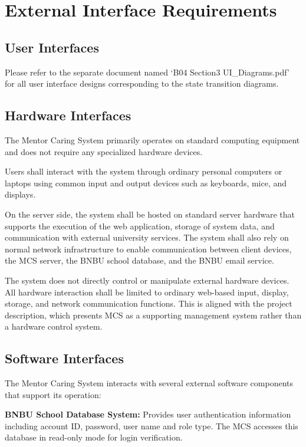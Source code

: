 \section{External Interface Requirements}

\subsection{User Interfaces}

Please refer to the separate document named `B04 Section3 UI\_Diagrams.pdf' for all user interface designs corresponding to the state transition diagrams.

\subsection{Hardware Interfaces}

The Mentor Caring System primarily operates on standard computing equipment and does not require any specialized hardware devices.

Users shall interact with the system through ordinary personal computers or laptops using common input and output devices such as keyboards, mice, and displays.

On the server side, the system shall be hosted on standard server hardware that supports the execution of the web application, storage of system data, and communication with external university services. The system shall also rely on normal network infrastructure to enable communication between client devices, the MCS server, the BNBU school database, and the BNBU email service.

The system does not directly control or manipulate external hardware devices. All hardware interaction shall be limited to ordinary web-based input, display, storage, and network communication functions. This is aligned with the project description, which presents MCS as a supporting management system rather than a hardware control system.

\subsection{Software Interfaces}

The Mentor Caring System interacts with several external software components that support its operation:

\textbf{BNBU School Database System:} Provides user authentication information including account ID, password, user name and role type. The MCS accesses this database in read-only mode for login verification.

